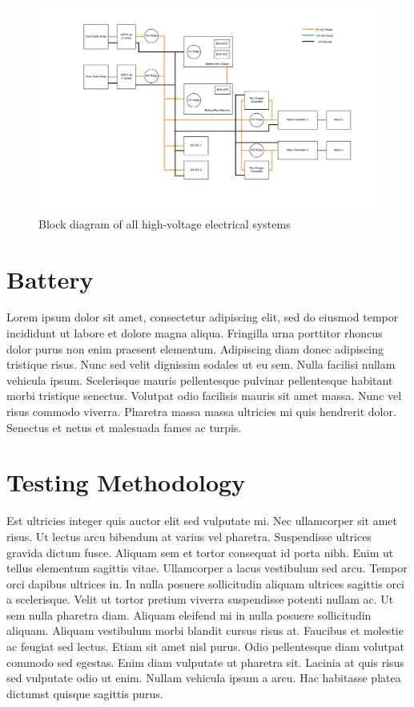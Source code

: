 \documentclass[10pt]{article}
\begin{document}
\begin{figure}
\centering
\includegraphics[width=\textwidth]{figures/msxii-electrical-hv-block-diagram}
\caption{Block diagram of all high-voltage electrical systems}
\label{fig:msxii-electrical-hv-block-diagram}
\end{figure}

\section{Battery}
Lorem ipsum dolor sit amet, consectetur adipiscing elit, sed do eiusmod tempor incididunt ut labore et dolore magna aliqua. Fringilla urna porttitor rhoncus dolor purus non enim praesent elementum. Adipiscing diam donec adipiscing tristique risus. Nunc sed velit dignissim sodales ut eu sem. Nulla facilisi nullam vehicula ipsum. Scelerisque mauris pellentesque pulvinar pellentesque habitant morbi tristique senectus. Volutpat odio facilisis mauris sit amet massa. Nunc vel risus commodo
viverra. Pharetra massa massa ultricies mi quis hendrerit dolor. Senectus et netus et malesuada fames ac turpis.

\section{Testing Methodology}
Est ultricies integer quis auctor elit sed vulputate mi. Nec ullamcorper sit amet risus. Ut lectus arcu bibendum at varius vel pharetra. Suspendisse ultrices gravida dictum fusce. Aliquam sem et tortor consequat id porta nibh. Enim ut tellus elementum sagittis vitae. Ullamcorper a lacus vestibulum sed arcu. Tempor orci dapibus ultrices in. In nulla posuere sollicitudin aliquam ultrices sagittis orci a scelerisque. Velit ut tortor pretium viverra suspendisse potenti nullam ac. Ut sem
nulla pharetra diam. Aliquam eleifend mi in nulla posuere sollicitudin aliquam. Aliquam vestibulum morbi blandit cursus risus at. Faucibus et molestie ac feugiat sed lectus. Etiam sit amet nisl purus. Odio pellentesque diam volutpat commodo sed egestas. Enim diam vulputate ut pharetra sit. Lacinia at quis risus sed vulputate odio ut enim. Nullam vehicula ipsum a arcu. Hac habitasse platea dictumst quisque sagittis purus.
\end{document}
